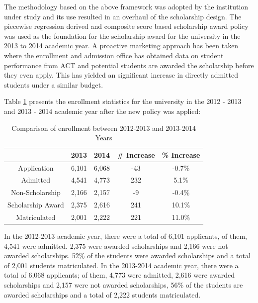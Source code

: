 \documentclass[12pt,english]{report}
\begin{document}
The methodology based on the above framework was adopted by the institution under study and its use resulted in an overhaul of the scholarship design. The piecewise regression derived and composite score based scholarship award policy was used as the foundation for the scholarship award for the university in the 2013 to 2014 academic year. A proactive marketing approach has been taken where the enrollment and admission office has obtained data on student performance from ACT and potential students are awarded the scholarship before they even apply. This has yielded an significant increase in directly admitted students under a similar budget. 

Table \ref{enroll_stats1} presents the enrollment statistics for the university in the 2012 - 2013 and 2013 - 2014 academic year after the new policy was applied:

\begin{table}[H]
\centering
\begin{tabular}{|c|c|c|c|c|}
\hline
& 2013 & 2014 & \# Increase & \% Increase \\ \hline
Application                    & 6,101 & 6,068 & -43         & -0.7\%      \\ \hline
Admitted                       & 4,541 & 4,773 & 232         & 5.1\%       \\ \hline
Non-Scholarship                & 2,166 & 2,157 & -9          & -0.4\%      \\ \hline
Scholarship Award              & 2,375 & 2,616 & 241         & 10.1\%      \\ \hline
Matriculated                   & 2,001 & 2,222 & 221         & 11.0\%      \\ \hline
\end{tabular}
\caption{ Comparison of enrollment between 2012-2013 and 2013-2014 Years}
\label{enroll_stats1}
\end{table}

In the 2012-2013 academic year, there were a total of 6,101 applicants, of them, 4,541 were admitted. 2,375 were awarded scholarships and 2,166 were not awarded scholarships. 52\% of the students were awarded scholarships and a total of 2,001 students matriculated. In the 2013-2014 academic year, there were a total of 6,068 applicants; of them, 4,773 were admitted, 2,616 were awarded scholarships and 2,157 were not awarded scholarships, 56\% of the students are awarded scholarships and a total of 2,222 students matriculated.
\end{document}
